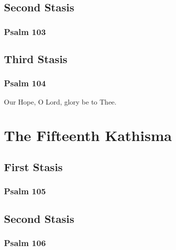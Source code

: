 \documentclass[12pt]{book}
\newcommand{\kathismabreak}{
  \medskip
  \begin{center}
  \begin{footnotesize}
  

  

  

  
  \end{footnotesize}
  \end{center}
  \smallbreak
}
\newcommand{\kathismaend}{
  \medskip
  \begin{center}
  \begin{footnotesize}
  

  

  Our Hope, O Lord, glory be to Thee.
  \end{footnotesize}
  \end{center}
  \smallbreak
}
\begin{document}
\pagebreak %
\kathismabreak

\subsection{Second Stasis}

\subsubsection{Psalm 103}


\kathismabreak

\subsection{Third Stasis}

\subsubsection{Psalm 104}


\kathismaend

\pagebreak %
\section{The Fifteenth Kathisma}

\subsection{First Stasis}

\subsubsection{Psalm 105}


\kathismabreak

\pagebreak %
\subsection{Second Stasis}

\subsubsection{Psalm 106}


\kathismabreak
\end{document}
